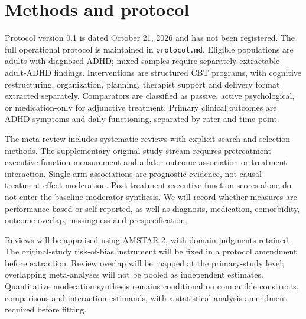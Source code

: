 \section{Methods and protocol}
\label{sec:methods}
Protocol version 0.1 is dated October 21, 2026 and has not been registered.
The full operational protocol is maintained in \texttt{protocol.md}.
Eligible populations are adults with diagnosed ADHD; mixed samples require separately extractable adult-ADHD findings.
Interventions are structured CBT programs, with cognitive restructuring, organization, planning, therapist support and delivery format extracted separately.
Comparators are classified as passive, active psychological, or medication-only for adjunctive treatment.
Primary clinical outcomes are ADHD symptoms and daily functioning, separated by rater and time point.

The meta-review includes systematic reviews with explicit search and selection methods.
The supplementary original-study stream requires pretreatment executive-function measurement and a later outcome association or treatment interaction.
Single-arm associations are prognostic evidence, not causal treatment-effect moderation.
Post-treatment executive-function scores alone do not enter the baseline moderator synthesis.
We will record whether measures are performance-based or self-reported, as well as diagnosis, medication, comorbidity, outcome overlap, missingness and prespecification.

Reviews will be appraised using AMSTAR 2, with domain judgments retained \citep{Shea2017}.
The original-study risk-of-bias instrument will be fixed in a protocol amendment before extraction.
Review overlap will be mapped at the primary-study level; overlapping meta-analyses will not be pooled as independent estimates.
Quantitative moderation synthesis remains conditional on compatible constructs, comparisons and interaction estimands, with a statistical analysis amendment required before fitting.
